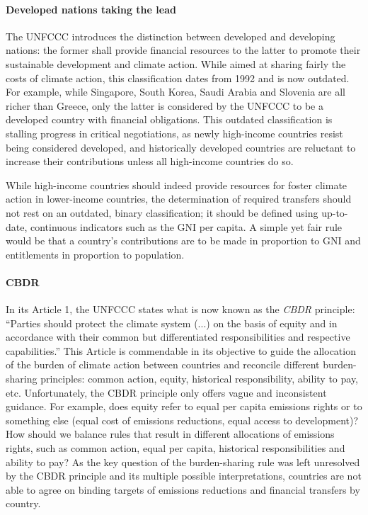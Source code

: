 \documentclass[12pt,english]{article}
\begin{document}
\paragraph{Developed nations taking the lead}
The UNFCCC introduces the distinction between developed and developing nations: the former shall provide financial resources to the latter to promote their sustainable development and climate action. While aimed at sharing fairly the costs of climate action, this classification dates from 1992 and is now outdated. For example, while Singapore, South Korea, Saudi Arabia and Slovenia are all richer than Greece, only the latter is considered by the UNFCCC to be a developed country with financial obligations. This outdated classification is stalling progress in critical negotiations, as newly high-income countries resist being considered developed, and historically developed countries are reluctant to increase their contributions unless all high-income countries do so.

While high-income countries should indeed provide resources for foster climate action in lower-income countries, the determination of required transfers should not rest on an outdated, binary classification; it should be defined using up-to-date, continuous indicators such as the GNI per capita. A simple yet fair rule would be that a country's contributions are to be made in proportion to GNI and entitlements in proportion to population. 

\paragraph{CBDR} In its Article 1, the UNFCCC states what is now known as the \textit{CBDR} principle: ``Parties should protect the climate system (...) on the basis of equity and in accordance with their common but differentiated responsibilities and respective capabilities.'' This Article is commendable in its objective to guide the allocation of the burden of climate action between countries and reconcile different burden-sharing principles: common action, equity, historical responsibility, ability to pay, etc. Unfortunately, the CBDR principle only offers vague and inconsistent guidance. For example, does equity refer to equal per capita emissions rights or to something else (equal cost of emissions reductions, equal access to development)? How should we balance rules that result in different allocations of emissions rights, such as common action, equal per capita, historical responsibilities and ability to pay? As the key question of the burden-sharing rule was left unresolved by the CBDR principle and its multiple possible interpretations, countries are not able to agree on binding targets of emissions reductions and financial transfers by country. 
\end{document}

